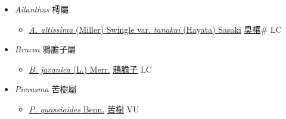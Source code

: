 
  \begin{itemize}
 \item[] \textit{Ailanthus} 樗屬
                    
  \begin{itemize}
        \item[] \href{http://www.theplantlist.org/tpl1.1/search?q=Ailanthus+altissima+var.+tanakai}{\textit{A. altissima} (Miller) Swingle var. \textit{tanakai} (Hayata) Sasaki}   \href{\detokenize{http://taibnet.sinica.edu.tw/chi/taibnet_species_list.php?T2=臭椿&T2_new_value=true&fr=y}}{臭椿}\# LC
  \end{itemize}
 \item[] \textit{Brucea} 鴉膽子屬
                    
  \begin{itemize}
        \item[] \href{http://www.theplantlist.org/tpl1.1/search?q=Brucea+javanica}{\textit{B. javanica} (L.) Merr.}   \href{\detokenize{http://taibnet.sinica.edu.tw/chi/taibnet_species_list.php?T2=鴉膽子&T2_new_value=true&fr=y}}{鴉膽子} LC
  \end{itemize}
 \item[] \textit{Picrasma} 苦樹屬
                    
  \begin{itemize}
        \item[] \href{http://www.theplantlist.org/tpl1.1/search?q=Picrasma+quassioides}{\textit{P. quassioides} Benn.}   \href{\detokenize{http://taibnet.sinica.edu.tw/chi/taibnet_species_list.php?T2=苦樹&T2_new_value=true&fr=y}}{苦樹} VU
  \end{itemize}
  \end{itemize}
